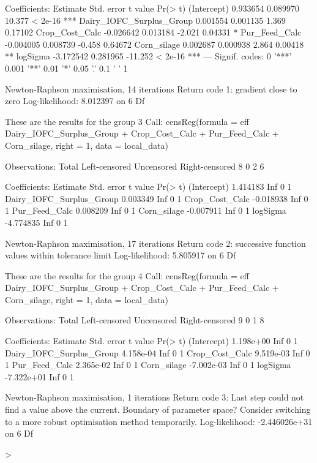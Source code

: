 \documentclass[12pt,]{article}
\begin{document}
\begin{Schunk}
\begin{Soutput}
Coefficients:
                          Estimate Std. error t value Pr(> t)    
(Intercept)               0.933654   0.089970  10.377 < 2e-16 ***
Dairy_IOFC_Surplus_Group  0.001554   0.001135   1.369 0.17102    
Crop_Cost_Calc           -0.026642   0.013184  -2.021 0.04331 *  
Pur_Feed_Calc            -0.004005   0.008739  -0.458 0.64672    
Corn_silage               0.002687   0.000938   2.864 0.00418 ** 
logSigma                 -3.172542   0.281965 -11.252 < 2e-16 ***
---
Signif. codes:  0 '***' 0.001 '**' 0.01 '*' 0.05 '.' 0.1 ' ' 1

Newton-Raphson maximisation, 14 iterations
Return code 1: gradient close to zero
Log-likelihood: 8.012397 on 6 Df

These are the results for the group 3
Call:
censReg(formula = eff ~ Dairy_IOFC_Surplus_Group + Crop_Cost_Calc + 
    Pur_Feed_Calc + Corn_silage, right = 1, data = local_data)

Observations:
         Total  Left-censored     Uncensored Right-censored 
             8              0              2              6 

Coefficients:
                          Estimate Std. error t value Pr(> t)
(Intercept)               1.414183        Inf       0       1
Dairy_IOFC_Surplus_Group  0.003349        Inf       0       1
Crop_Cost_Calc           -0.018938        Inf       0       1
Pur_Feed_Calc             0.008209        Inf       0       1
Corn_silage              -0.007911        Inf       0       1
logSigma                 -4.774835        Inf       0       1

Newton-Raphson maximisation, 17 iterations
Return code 2: successive function values within tolerance limit
Log-likelihood: 5.805917 on 6 Df

These are the results for the group 4
Call:
censReg(formula = eff ~ Dairy_IOFC_Surplus_Group + Crop_Cost_Calc + 
    Pur_Feed_Calc + Corn_silage, right = 1, data = local_data)

Observations:
         Total  Left-censored     Uncensored Right-censored 
             9              0              1              8 

Coefficients:
                           Estimate Std. error t value Pr(> t)
(Intercept)               1.198e+00        Inf       0       1
Dairy_IOFC_Surplus_Group  4.158e-04        Inf       0       1
Crop_Cost_Calc            9.519e-03        Inf       0       1
Pur_Feed_Calc             2.365e-02        Inf       0       1
Corn_silage              -7.002e-03        Inf       0       1
logSigma                 -7.322e+01        Inf       0       1

Newton-Raphson maximisation, 1 iterations
Return code 3: Last step could not find a value above the current.
Boundary of parameter space?  
Consider switching to a more robust optimisation method temporarily.
Log-likelihood: -2.446026e+31 on 6 Df
\end{Soutput}
\begin{Sinput}
> 
\end{Sinput}
\end{Schunk}
\end{document}
